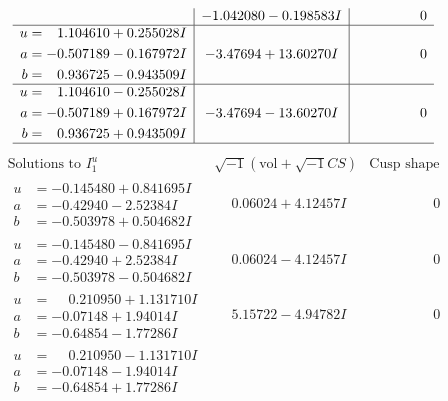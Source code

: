 \documentclass[1p]{elsarticle_modified}
\theoremstyle{definition}
\newcommand{\I}{\sqrt{-1}}
\begin{document}
$$\begin{array}{c|c|c}
 & -1.042080 - 0.198583 I & \phantom{-0.000000 } 0 \\ \hline\begin{aligned}
u &= \phantom{-}1.104610 + 0.255028 I \\
a &= -0.507189 - 0.167972 I \\
b &= \phantom{-}0.936725 - 0.943509 I\end{aligned}
 & -3.47694 + 13.60270 I & \phantom{-0.000000 } 0 \\ \hline\begin{aligned}
u &= \phantom{-}1.104610 - 0.255028 I \\
a &= -0.507189 + 0.167972 I \\
b &= \phantom{-}0.936725 + 0.943509 I\end{aligned}
 & -3.47694 - 13.60270 I & \phantom{-0.000000 } 0\\
 \hline 
 \end{array}$$\newpage$$\begin{array}{c|c|c}  
\text{Solutions to }I^u_{1}& \I (\text{vol} + \sqrt{-1}CS) & \text{Cusp shape}\\
 \hline 
\begin{aligned}
u &= -0.145480 + 0.841695 I \\
a &= -0.42940 - 2.52384 I \\
b &= -0.503978 + 0.504682 I\end{aligned}
 & \phantom{-}0.06024 + 4.12457 I & \phantom{-0.000000 } 0 \\ \hline\begin{aligned}
u &= -0.145480 - 0.841695 I \\
a &= -0.42940 + 2.52384 I \\
b &= -0.503978 - 0.504682 I\end{aligned}
 & \phantom{-}0.06024 - 4.12457 I & \phantom{-0.000000 } 0 \\ \hline\begin{aligned}
u &= \phantom{-}0.210950 + 1.131710 I \\
a &= -0.07148 + 1.94014 I \\
b &= -0.64854 - 1.77286 I\end{aligned}
 & \phantom{-}5.15722 - 4.94782 I & \phantom{-0.000000 } 0 \\ \hline\begin{aligned}
u &= \phantom{-}0.210950 - 1.131710 I \\
a &= -0.07148 - 1.94014 I \\
b &= -0.64854 + 1.77286 I\end{aligned}

\end{array}$$
\end{document}
